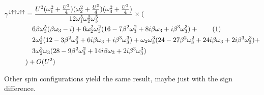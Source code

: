 \begin{align*}
 \stepcounter{equation}
 \gamma^{\downarrow\uparrow\uparrow\downarrow\uparrow\uparrow} & =
  \frac{U^2(\omega_1^2+\frac{U^2}{4})(\omega_2^2+\frac{U^2}{4})(\omega_3^2+\frac{U^2}{4})}{12\omega_1^5\omega_2^2\omega_3^5}\times( \\
   &\quad6\beta\omega_3^5(\beta\omega_3-i)+6\omega_2^2\omega_3^2(16-7\beta^2\omega_3^2+8i\beta\omega_3+i\beta^3\omega_3^3)+ \tag{\theequation} \\
   &\quad2\omega_2^4(12-3\beta^2\omega_3^2+6i\beta\omega_3+i\beta^3\omega_3^3)+\omega_2\omega_3^3(24-27\beta^2\omega_3^2+24i\beta\omega_3+2i\beta^3\omega_3^3)+ \\
   &\quad3\omega_2^3\omega_3(28-9\beta^2\omega_3^2+14i\beta\omega_3+2i\beta^3\omega_3^3)\\
   & ) + O(U^2)
\end{align*}

Other spin configurations yield the same result, maybe just with the sign difference.


